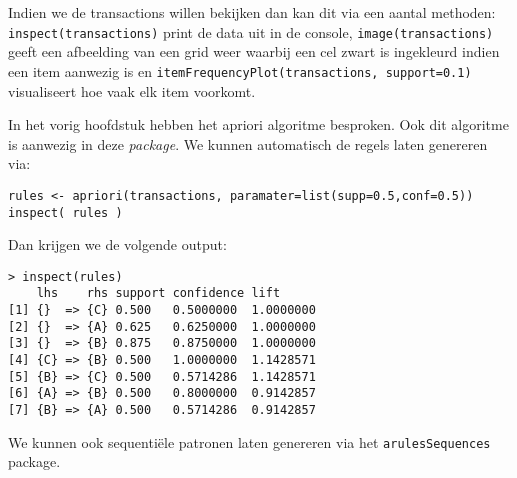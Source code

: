 Indien we de transactions willen bekijken dan kan dit via een aantal methoden: \texttt{inspect(transactions)} print de data uit in de console, \texttt{image(transactions)} geeft een afbeelding van een grid weer waarbij een cel zwart is ingekleurd indien een item aanwezig is en \texttt{itemFrequencyPlot(transactions, support=0.1)} visualiseert hoe vaak elk item voorkomt.

In het vorig hoofdstuk hebben het apriori algoritme besproken. Ook dit algoritme is aanwezig in deze \emph{package}. We kunnen automatisch de regels laten genereren via:
\begin{verbatim}
rules <- apriori(transactions, paramater=list(supp=0.5,conf=0.5))
inspect( rules )
\end{verbatim}
Dan krijgen we de volgende output:
\begin{verbatim}
> inspect(rules)
    lhs    rhs support confidence lift     
[1] {}  => {C} 0.500   0.5000000  1.0000000
[2] {}  => {A} 0.625   0.6250000  1.0000000
[3] {}  => {B} 0.875   0.8750000  1.0000000
[4] {C} => {B} 0.500   1.0000000  1.1428571
[5] {B} => {C} 0.500   0.5714286  1.1428571
[6] {A} => {B} 0.500   0.8000000  0.9142857
[7] {B} => {A} 0.500   0.5714286  0.9142857
\end{verbatim}

We kunnen ook sequenti\"ele patronen laten genereren via het \texttt{arulesSequences} package. 